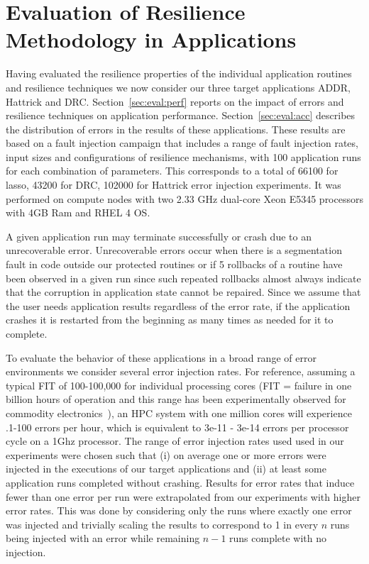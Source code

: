 \documentclass{sig-alternate}
\begin{document}
\section{Evaluation of Resilience Methodology in Applications}
\label{sec:eval}

Having evaluated the resilience properties of the individual application routines and resilience techniques we now consider our three target applications ADDR, Hattrick and DRC.
Section~\ref{sec:eval:perf} reports on the impact of errors and resilience techniques on application performance. Section~\ref{sec:eval:acc} describes the distribution of errors in the results of these applications.
These results are based on a fault injection campaign that includes a range of fault injection rates, input sizes and configurations of resilience mechanisms, with 100 application runs for each combination of parameters.
This corresponds to a total of 66100 for lasso, 43200 for DRC, 102000 for Hattrick error injection experiments.
It was performed on compute nodes with two 2.33 GHz dual-core Xeon E5345 processors with 4GB Ram and RHEL 4 OS.

A given application run may terminate successfully or crash due to an unrecoverable error.
Unrecoverable errors occur when there is a segmentation fault in code outside our protected routines or if 5 rollbacks of a routine have been observed in a given run since such repeated rollbacks almost always indicate that the corruption in application state cannot be repaired.
Since we assume that the user needs application results regardless of the error rate, if the application crashes it is restarted from the beginning as many times as needed for it to complete.

To evaluate the behavior of these applications in a broad range of error environments we consider several error injection rates.
For reference, assuming a typical FIT of 100-100,000 for individual processing cores (FIT = failure in one billion hours of operation and this range has been experimentally observed for commodity electronics~\cite{mem_errors:2010}), an HPC system with one million cores will experience .1-100 errors per hour, which is equivalent to 3e-11 - 3e-14 errors per processor cycle on a 1Ghz processor.
The range of error injection rates used used in our experiments were chosen such that (i) on average one or more errors were injected in the executions of our target applications and (ii) at least some application runs completed without crashing.
Results for error rates that induce fewer than one error per run were extrapolated from our experiments with higher error rates.
This was done by considering only the runs where exactly one error was injected and trivially scaling the results to correspond to 1 in every $n$ runs being injected with an error while remaining $n-1$ runs complete with no injection.
\end{document}
